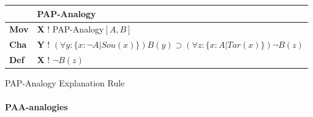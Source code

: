 					
					\begin{Scheme}[H]\footnotesize
               		\centering
               		\begin{tabular}{l l}
               			                   & \textbf{PAP-Analogy}                                                                                                                                                                                                                                                                               \\ \toprule
               			\textbf{Mov}      & \textbf{X} ! PAP-Analogy$[A,B]$                                                                                                                                                                                                                                                                                     \\ \midrule
               			\textbf{Cha} & \textbf{Y} ! $(\forall y: \{ x: \neg A| Sou(x)\} ) B(y) \supset (\forall z : \{ x: A| Tar(x)\} ) \neg B(z)$                                                                                                                                                                                                                                                                                           \\ \midrule
               			\textbf{Def}   & \textbf{X} ! $\neg B(z)$ \\ \bottomrule
               		\end{tabular}
               		\caption{PAP-Analogy Explanation Rule}
               		\label{PAPAnalogyExplanation}
					\end{Scheme}
					
			\newpage
			\paragraph{PAA-analogies}
			
